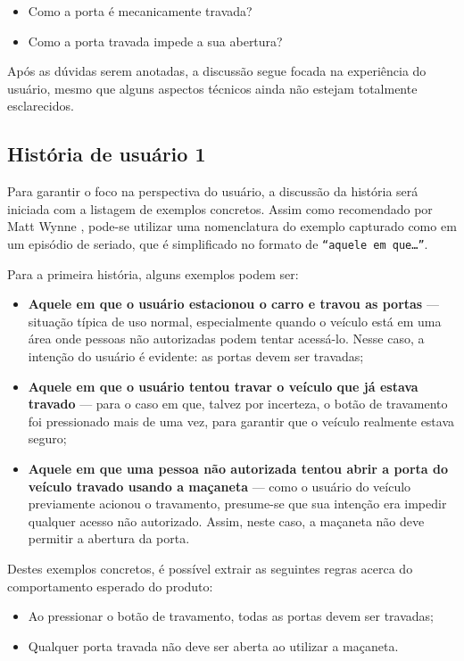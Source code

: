 \begin{itemize}
    \item Como a porta é mecanicamente travada?
    \item Como a porta travada impede a sua abertura?
\end{itemize}

Após as dúvidas serem anotadas, a discussão segue focada na experiência do usuário, mesmo que alguns aspectos técnicos ainda não estejam totalmente esclarecidos.

\subsection{História de usuário 1}
\label{sbs:historia1}
Para garantir o foco na perspectiva do usuário, a discussão da história será iniciada com a listagem de exemplos concretos. Assim como recomendado por 
Matt Wynne \cite{cucumberExampleMapping}, pode-se utilizar uma nomenclatura do exemplo capturado como em um episódio de seriado, que é simplificado 
no formato de \texttt{“aquele em que…”}.

Para a primeira história, alguns exemplos podem ser:

\begin{itemize}
    \item \textbf{Aquele em que o usuário estacionou o carro e travou as portas} — situação típica de uso normal, especialmente quando o veículo está em uma área onde pessoas não autorizadas podem tentar acessá-lo. Nesse caso, a intenção do usuário é evidente: as portas devem ser travadas;
    \item \textbf{Aquele em que o usuário tentou travar o veículo que já estava travado} — para o caso em que, talvez por incerteza, o botão de travamento foi pressionado mais de uma vez, para garantir que o veículo realmente estava seguro;
    \item \textbf{Aquele em que uma pessoa não autorizada tentou abrir a porta do veículo travado usando a maçaneta} — como o usuário do veículo previamente acionou o travamento, presume-se que sua intenção era impedir qualquer acesso não autorizado. Assim, neste caso, a maçaneta não deve permitir a abertura da porta.
\end{itemize}

Destes exemplos concretos, é possível extrair as seguintes regras acerca do comportamento esperado do produto:

\begin{itemize}
    \item Ao pressionar o botão de travamento, todas as portas devem ser travadas;
    \item Qualquer porta travada não deve ser aberta ao utilizar a maçaneta.
\end{itemize}

